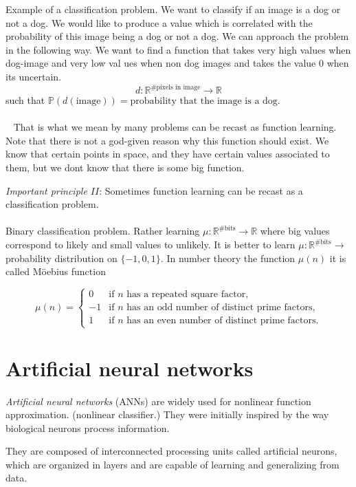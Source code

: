 \documentclass[../main.tex]{subfiles}
\begin{document}
\begin{xmpl} Example of a classification problem. We want to classify if an image is a dog or not a dog. We would like to produce a value which is correlated with the probability of this image being a dog or not a dog.  We can approach the problem in the following way. We want to find a function that takes very high values when dog-image and very low val ues when non dog images and takes the value 0 when its uncertain. 
	$$d: \mathbb{R}^{\# \text{pixels in image}} \rightarrow \mathbb{R} $$
	such that $\mathbb{P}(d(\text{image})) = \text{probability that the image is a dog.}$ \\ \\  
	That is what we mean by many problems can be recast as function learning. Note that there is not a god-given reason why this function should exist. We know that certain points in space, and they have certain values associated to them, but we dont know that there is some big function. 
\end{xmpl}

\noindent \textit{Important principle $II$}: Sometimes function learning can be recast as a classification problem.  
\\ \\ 
Binary classification problem. 
Rather learning $\mu : \mathbb{R}^{\# \text{bits}} \rightarrow \mathbb{R}$ where big values correspond to likely and small values to unlikely. It is better to learn $\mu : \mathbb{R}^{\# \text{bits}} \rightarrow $ probability distribution on $\{-1,0,1\}$. In number theory the function $\mu(n)$ it is called Möebius function 

\[
\mu(n) = \begin{cases}
	0 & \text{if } n \text{ has a repeated square factor}, \\
	-1 & \text{if } n \text{ has an odd number of distinct prime factors}, \\
	1 & \text{if } n \text{ has an even number of distinct prime factors}.
\end{cases}
\]

	
	
\section{Artificial neural networks }

\noindent \textit{Artificial neural networks} (ANNs) are widely used for nonlinear function approximation.
(nonlinear classifier.)  They were initially inspired by the way biological neurons process information. 

They are composed of interconnected processing units called artificial neurons, which are organized in layers and are capable of learning and generalizing from data.	
	
\end{document}
